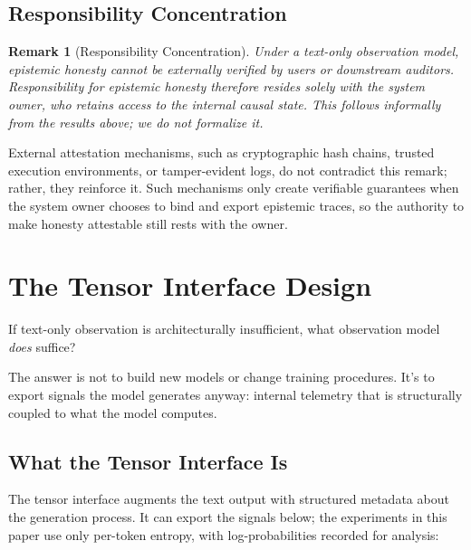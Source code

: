 \documentclass[11pt]{article}
\newtheorem{remark}{Remark}
\begin{document}
\subsection{Responsibility Concentration}

\begin{remark}[Responsibility Concentration]\label{cor:responsibility}
Under a text-only observation model, epistemic honesty cannot be externally
verified by users or downstream auditors. Responsibility for epistemic honesty
therefore resides solely with the system owner, who retains access to the
internal causal state. This follows informally from the results above; we do
not formalize it.
\end{remark}

External attestation mechanisms, such as cryptographic hash chains, trusted execution
environments, or tamper-evident logs, do not contradict this remark; rather,
they reinforce it. Such mechanisms only create verifiable guarantees when the
system owner chooses to bind and export epistemic traces, so the authority to
make honesty attestable still rests with the owner.

\section{The Tensor Interface Design}\label{sec:design}

If text-only observation is architecturally insufficient, what observation model \emph{does} suffice?

The answer is not to build new models or change training procedures. It's to export signals the model generates anyway: internal telemetry that is structurally coupled to what the model computes.

\subsection{What the Tensor Interface Is}

The tensor interface augments the text output with structured metadata about the generation process. It can export the signals below; the experiments in this paper use only per-token entropy, with log-probabilities recorded for analysis:
\end{document}
